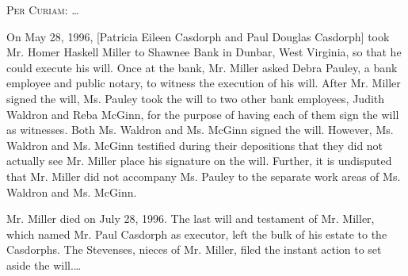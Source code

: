 
\opinion \textsc{Per Curiam}: \dots

 On May 28, 1996, [Patricia Eileen Casdorph and Paul Douglas Casdorph] took Mr.
Homer Haskell Miller to Shawnee Bank in Dunbar, West Virginia, so that he could
execute his will. Once at the bank, Mr. Miller asked Debra Pauley, a bank
employee and public notary, to witness the execution of his will. After Mr.
Miller signed the will, Ms. Pauley took the will to two other bank employees,
Judith Waldron and Reba McGinn, for the purpose of having each of them sign the
will as witnesses. Both Ms. Waldron and Ms. McGinn signed the will. However,
Ms. Waldron and Ms. McGinn testified during their depositions that they did not
actually see Mr. Miller place his signature on the will. Further, it is
undisputed that Mr. Miller did not accompany Ms. Pauley to the separate work
areas of Ms. Waldron and Ms. McGinn. 

Mr. Miller died on July 28, 1996. The last will and testament of Mr. Miller,
which named Mr. Paul Casdorph as executor, left the bulk of his estate to the
Casdorphs. The Stevenses, nieces of Mr. Miller, filed the instant action to set
aside the will.\ldots\unskip{} 

